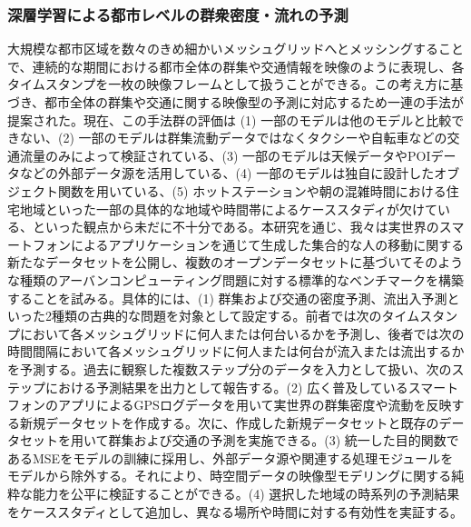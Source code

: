\subsubsection{深層学習による都市レベルの群衆密度・流れの予測}
大規模な都市区域を数々のきめ細かいメッシュグリッドへとメッシングすることで、連続的な期間における都市全体の群集や交通情報を映像のように表現し、各タイムスタンプを一枚の映像フレームとして扱うことができる。この考え方に基づき、都市全体の群集や交通に関する映像型の予測に対応するため一連の手法が提案された。現在、この手法群の評価は (1) 一部のモデルは他のモデルと比較できない、(2) 一部のモデルは群集流動データではなくタクシーや自転車などの交通流量のみによって検証されている、(3) 一部のモデルは天候データやPOIデータなどの外部データ源を活用している、(4) 一部のモデルは独自に設計したオブジェクト関数を用いている、(5) ホットステーションや朝の混雑時間における住宅地域といった一部の具体的な地域や時間帯によるケーススタディが欠けている、といった観点から未だに不十分である。本研究を通じ、我々は実世界のスマートフォンによるアプリケーションを通じて生成した集合的な人の移動に関する新たなデータセットを公開し、複数のオープンデータセットに基づいてそのような種類のアーバンコンピューティング問題に対する標準的なベンチマークを構築することを試みる。具体的には、(1) 群集および交通の密度予測、流出入予測といった2種類の古典的な問題を対象として設定する。前者では次のタイムスタンプにおいて各メッシュグリッドに何人または何台いるかを予測し、後者では次の時間間隔において各メッシュグリッドに何人または何台が流入または流出するかを予測する。過去に観察した複数ステップ分のデータを入力として扱い、次のステップにおける予測結果を出力として報告する。(2) 広く普及しているスマートフォンのアプリによるGPSログデータを用いて実世界の群集密度や流動を反映する新規データセットを作成する。次に、作成した新規データセットと既存のデータセットを用いて群集および交通の予測を実施できる。(3) 統一した目的関数であるMSEをモデルの訓練に採用し、外部データ源や関連する処理モジュールをモデルから除外する。それにより、時空間データの映像型モデリングに関する純粋な能力を公平に検証することができる。(4) 選択した地域の時系列の予測結果をケーススタディとして追加し、異なる場所や時間に対する有効性を実証する。


